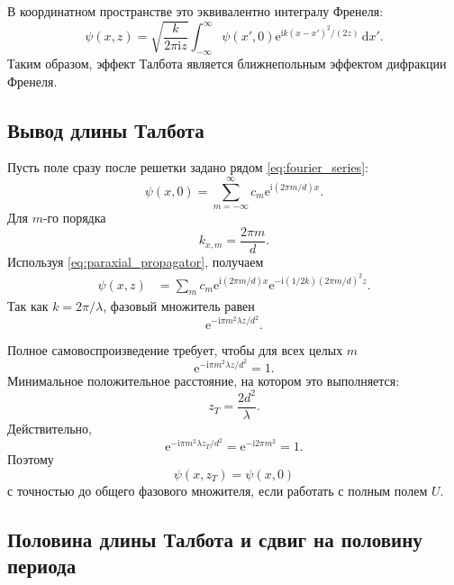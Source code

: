 \documentclass[12pt,a4paper]{article}
\newcommand{\dd}{\,\mathrm{d}}
\newcommand{\ii}{\mathrm{i}}
\newcommand{\e}{\mathrm{e}}
\begin{document}
В координатном пространстве это эквивалентно интегралу Френеля:
\begin{equation}
    \psi(x,z)=
    \sqrt{\frac{k}{2\pi \ii z}}
    \int_{-\infty}^{\infty}
    \psi(x',0)
    \e^{\ii k(x-x')^2/(2z)}\dd x'.
    \label{eq:fresnel_integral}
\end{equation}
Таким образом, эффект Талбота является ближнепольным эффектом дифракции Френеля.

\subsection{Вывод длины Талбота}

Пусть поле сразу после решетки задано рядом \eqref{eq:fourier_series}:
\begin{equation}
    \psi(x,0)=
    \sum_{m=-\infty}^{\infty} c_m
    \e^{\ii(2\pi m/d)x}.
\end{equation}
Для $m$-го порядка
\begin{equation}
    k_{x,m}=\frac{2\pi m}{d}.
\end{equation}
Используя \eqref{eq:paraxial_propagator}, получаем
\begin{align}
    \psi(x,z)
    &=
    \sum_m c_m
    \e^{\ii(2\pi m/d)x}
    \e^{-\ii(1/2k)(2\pi m/d)^2z}.
\end{align}
Так как $k=2\pi/\lambda$, фазовый множитель равен
\begin{equation}
    \e^{-\ii\pi m^2\lambda z/d^2}.
    \label{eq:talbot_phase}
\end{equation}

Полное самовоспроизведение требует, чтобы для всех целых $m$
\begin{equation}
    \e^{-\ii\pi m^2\lambda z/d^2}=1.
\end{equation}
Минимальное положительное расстояние, на котором это выполняется:
\begin{equation}
    z_T=\frac{2d^2}{\lambda}.
    \label{eq:talbot_length}
\end{equation}
Действительно,
\begin{equation}
    \e^{-\ii\pi m^2\lambda z_T/d^2}
    =
    \e^{-\ii 2\pi m^2}=1.
\end{equation}
Поэтому
\begin{equation}
    \psi(x,z_T)=\psi(x,0)
\end{equation}
с точностью до общего фазового множителя, если работать с полным полем $U$.

\subsection{Половина длины Талбота и сдвиг на половину периода}
\end{document}
